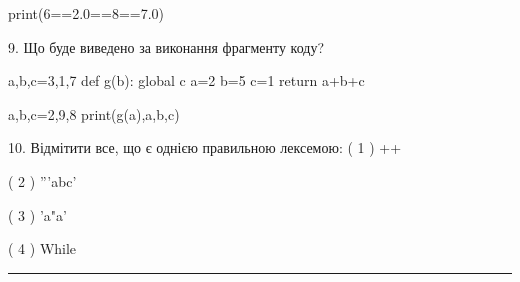 \documentclass[11pt]{article}
\begin{document}
print(6==2.0==8==7.0)

9. Що буде виведено за виконання фрагменту коду?

a,b,c=3,1,7
def g(b):
global c    a=2
    b=5
    c=1
    return a+b+c

a,b,c=2,9,8
print(g(a),a,b,c)

10. Відмітити все, що є однією правильною лексемою:
( 1 ) ++

( 2 ) '''abc'

( 3 ) 'a"a'

( 4 ) While











\vspace{10mm}
\noindent\rule{\textwidth}{0.3pt}
\vspace{8mm}
\end{document}
